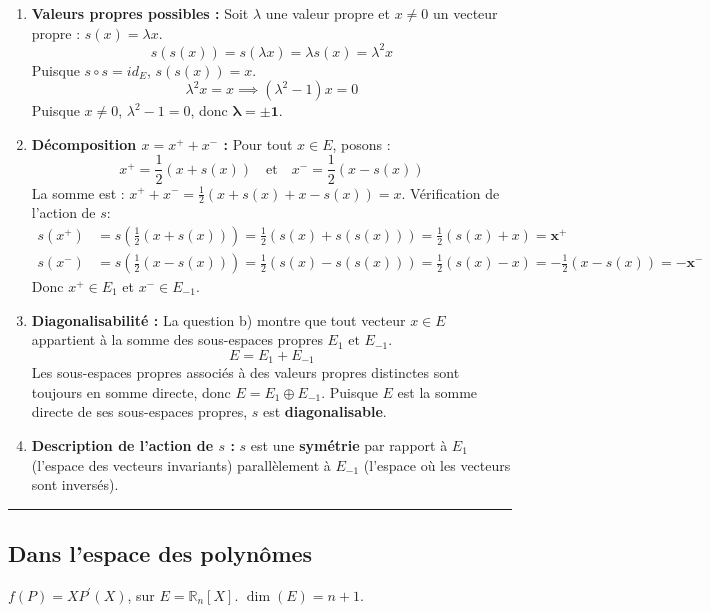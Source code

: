 \documentclass[french]{yLectureNote}
\begin{document}
\begin{enumerate}
    \item \textbf{Valeurs propres possibles :}
    Soit $\lambda$ une valeur propre et $x \ne 0$ un vecteur propre : $s(x) = \lambda x$.
    $$s(s(x)) = s(\lambda x) = \lambda s(x) = \lambda^2 x$$
    Puisque $s\circ s = id_E$, $s(s(x)) = x$.
    $$\lambda^2 x = x \implies (\lambda^2 - 1) x = 0$$
    Puisque $x \ne 0$, $\lambda^2 - 1 = 0$, donc $\mathbf{\lambda = \pm 1}$.

    \item \textbf{Décomposition $x=x^{+}+x^{-}$ :}
    Pour tout $x \in E$, posons :
    $$x^{+} = \frac{1}{2}(x + s(x)) \quad \text{et} \quad x^{-} = \frac{1}{2}(x - s(x))$$
    La somme est : $x^{+} + x^{-} = \frac{1}{2}(x + s(x) + x - s(x)) = x$.
    Vérification de l'action de $s$:
    \begin{align*} s(x^{+}) &= s\left(\frac{1}{2}(x + s(x))\right) = \frac{1}{2}(s(x) + s(s(x))) = \frac{1}{2}(s(x) + x) = \mathbf{x^{+}} \\ s(x^{-}) &= s\left(\frac{1}{2}(x - s(x))\right) = \frac{1}{2}(s(x) - s(s(x))) = \frac{1}{2}(s(x) - x) = -\frac{1}{2}(x - s(x)) = \mathbf{-x^{-}}\end{align*}
    Donc $x^{+} \in E_1$ et $x^{-} \in E_{-1}$.

    \item \textbf{Diagonalisabilité :}
    La question b) montre que tout vecteur $x \in E$ appartient à la somme des sous-espaces propres $E_1 \text{ et } E_{-1}$.
    $$E = E_1 + E_{-1}$$
    Les sous-espaces propres associés à des valeurs propres distinctes sont toujours en somme directe, donc $E = E_1 \oplus E_{-1}$.
    Puisque $E$ est la somme directe de ses sous-espaces propres, $s$ est \textbf{diagonalisable}.

    \item \textbf{Description de l'action de $s$ :}
    $s$ est une \textbf{symétrie} par rapport à $E_1$ (l'espace des vecteurs invariants) parallèlement à $E_{-1}$ (l'espace où les vecteurs sont inversés).
\end{enumerate}

\hrule

\subsection{Dans l'espace des polynômes}
$f(P)=XP^{\prime}(X)$, sur $E=\mathbb{R}_{n}[X]$. $\dim(E) = n+1$.
\end{document}
